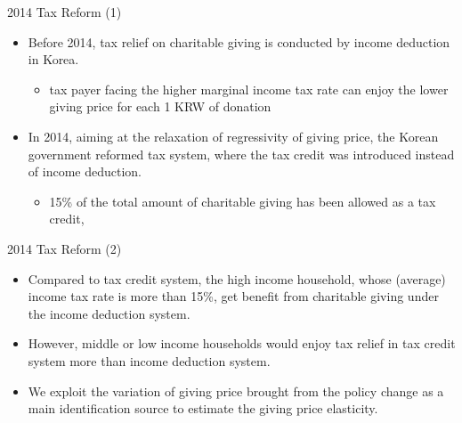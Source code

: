\documentclass[
  ignorenonframetext,
  aspectratio=169,
]{beamer}
\providecommand{\tightlist}{%
  \setlength{\itemsep}{0pt}\setlength{\parskip}{0pt}}
\begin{document}
\begin{frame}{2014 Tax Reform (1)}
\protect\hypertarget{tax-reform-1}{}
\begin{itemize}
\tightlist
\item
  Before 2014, tax relief on charitable giving is conducted by income deduction in Korea.

  \begin{itemize}
  \tightlist
  \item
    tax payer facing the higher marginal income tax rate can enjoy the lower giving price for each 1 KRW of donation
  \end{itemize}
\item
  In 2014, aiming at the relaxation of regressivity of giving price, the Korean government reformed tax system, where the tax credit was introduced instead of income deduction.

  \begin{itemize}
  \tightlist
  \item
    15\% of the total amount of charitable giving has been allowed as a tax credit,
  \end{itemize}
\end{itemize}
\end{frame}

\begin{frame}{2014 Tax Reform (2)}
\protect\hypertarget{tax-reform-2}{}
\begin{itemize}
\tightlist
\item
  Compared to tax credit system, the high income household, whose (average) income tax rate is more than 15\%,
  get benefit from charitable giving under the income deduction system.
\item
  However, middle or low income households would enjoy tax relief in tax credit system more than income deduction system.
\item
  We exploit the variation of giving price brought from the policy change as a main identification source to estimate the giving price elasticity.
\end{itemize}
\end{frame}
\end{document}

